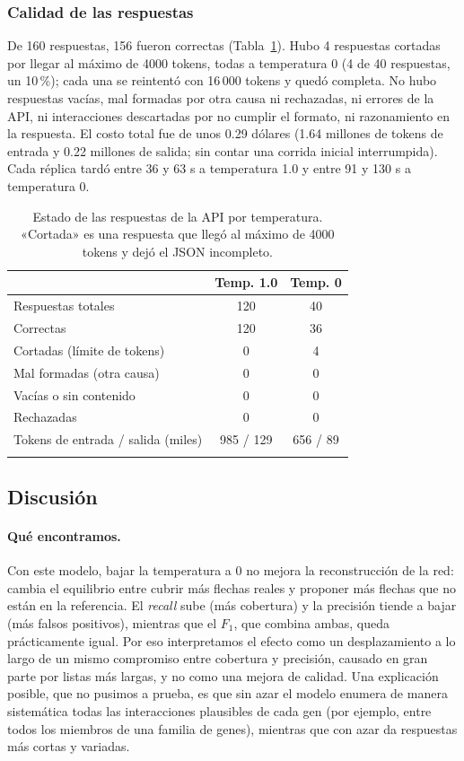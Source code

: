 \documentclass[unnumsec,webpdf,contemporary,large]{oup-authoring-template}
\begin{document}
\subsubsection{Calidad de las respuestas}

De 160 respuestas, 156 fueron correctas (Tabla~\ref{tab:calidad}). Hubo 4 respuestas cortadas por llegar al máximo de 4000 tokens, todas a temperatura 0 (4 de 40 respuestas, un 10\,\%); cada una se reintentó con 16\,000 tokens y quedó completa. No hubo respuestas vacías, mal formadas por otra causa ni rechazadas, ni errores de la API, ni interacciones descartadas por no cumplir el formato, ni razonamiento en la respuesta. El costo total fue de unos 0.29 dólares (1.64 millones de tokens de entrada y 0.22 millones de salida; sin contar una corrida inicial interrumpida). Cada réplica tardó entre 36 y 63 s a temperatura 1.0 y entre 91 y 130 s a temperatura 0.

\begin{table}[t]
\caption{Estado de las respuestas de la API por temperatura. «Cortada» es una respuesta que llegó al máximo de 4000 tokens y dejó el JSON incompleto.\label{tab:calidad}}
\begin{tabular*}{\columnwidth}{@{\extracolsep\fill}lcc@{}}
\toprule
 & Temp. 1.0 & Temp. 0 \\
\midrule
Respuestas totales & 120 & 40 \\
Correctas & 120 & 36 \\
Cortadas (límite de tokens) & 0 & 4 \\
Mal formadas (otra causa) & 0 & 0 \\
Vacías o sin contenido & 0 & 0 \\
Rechazadas & 0 & 0 \\
Tokens de entrada / salida (miles) & 985 / 129 & 656 / 89 \\
\botrule
\end{tabular*}
\end{table}

\subsection{Discusión}\label{sec:A:discusion}

\paragraph{Qué encontramos.} Con este modelo, bajar la temperatura a 0 no mejora la reconstrucción de la red: cambia el equilibrio entre cubrir más flechas reales y proponer más flechas que no están en la referencia. El \emph{recall} sube (más cobertura) y la precisión tiende a bajar (más falsos positivos), mientras que el $F_1$, que combina ambas, queda prácticamente igual. Por eso interpretamos el efecto como un desplazamiento a lo largo de un mismo compromiso entre cobertura y precisión, causado en gran parte por listas más largas, y no como una mejora de calidad. Una explicación posible, que no pusimos a prueba, es que sin azar el modelo enumera de manera sistemática todas las interacciones plausibles de cada gen (por ejemplo, entre todos los miembros de una familia de genes), mientras que con azar da respuestas más cortas y variadas.
\end{document}
